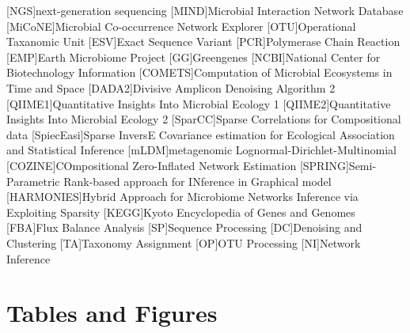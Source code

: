 \documentclass[letterpaper,12pt]{article}
\providecommand{\DIFaddbegin}{} %
\providecommand{\DIFaddend}{} %
\providecommand{\DIFdelbegin}{} %
\providecommand{\DIFdelend}{} %
\newcommand{\DIFscaledelfig}{0.5}
\newlength{\DIFdelgraphicswidth} %
\newlength{\DIFdelgraphicsheight} %
\newcommand{\DIFaddincludegraphics}[2][]{{\color{blue}\fbox{\DIFOincludegraphics[#1]{#2}}}} %
\newcommand{\DIFdelincludegraphics}[2][]{%
\sbox{\DIFdelgraphicsbox}{\DIFOincludegraphics[#1]{#2}}%
\settoboxwidth{\DIFdelgraphicswidth}{\DIFdelgraphicsbox} %
\settoboxtotalheight{\DIFdelgraphicsheight}{\DIFdelgraphicsbox} %
\scalebox{\DIFscaledelfig}{%
\parbox[b]{\DIFdelgraphicswidth}{\usebox{\DIFdelgraphicsbox}\\[-\baselineskip] \rule{\DIFdelgraphicswidth}{0em}}\llap{\resizebox{\DIFdelgraphicswidth}{\DIFdelgraphicsheight}{%
\setlength{\unitlength}{\DIFdelgraphicswidth}%
\begin{picture}(1,1)%
\thicklines\linethickness{2pt} %
{\color[rgb]{1,0,0}\put(0,0){\framebox(1,1){}}}%
{\color[rgb]{1,0,0}\put(0,0){\line( 1,1){1}}}%
{\color[rgb]{1,0,0}\put(0,1){\line(1,-1){1}}}%
\end{picture}%
}\hspace*{3pt}}} %
} %
\DeclareRobustCommand{\DIFaddbegin}{\DIFOaddbegin \let\includegraphics\DIFaddincludegraphics} %
\DeclareRobustCommand{\DIFaddend}{\DIFOaddend \let\includegraphics\DIFOincludegraphics} %
\DeclareRobustCommand{\DIFdelbegin}{\DIFOdelbegin \let\includegraphics\DIFdelincludegraphics} %
\DeclareRobustCommand{\DIFdelend}{\DIFOaddend \let\includegraphics\DIFOincludegraphics} %
\begin{document}


\begin{acronym}[XXXXXXXX]
    [NGS]{next-generation sequencing}
    [MIND]{Microbial Interaction Network Database}
    [MiCoNE]{Microbial Co-occurrence Network Explorer}
    [OTU]{Operational Taxanomic Unit}
    [ESV]{Exact Sequence Variant}
    [PCR]{Polymerase Chain Reaction}
    [EMP]{Earth Microbiome Project}
    [GG]{Greengenes}
    [NCBI]{National Center for Biotechnology Information}
    [COMETS]{Computation of Microbial Ecosystems in Time and Space}
    [DADA2]{Divisive Amplicon Denoising Algorithm 2}
    [QIIME1]{Quantitative Insights Into Microbial Ecology 1}
    [QIIME2]{Quantitative Insights Into Microbial Ecology 2}
    [SparCC]{Sparse Correlations for Compositional data}
    [SpiecEasi]{Sparse InversE Covariance estimation for Ecological Association and Statistical Inference}
    [mLDM]{metagenomic Lognormal-Dirichlet-Multinomial}
    \DIFdelbegin %
\DIFdelend \DIFaddbegin {}[COZINE]{COmpositional Zero-Inflated Network Estimation}
    [SPRING]{Semi-Parametric Rank-based approach for INference in Graphical model}
    [HARMONIES]{Hybrid Approach for Microbiome Networks Inference via Exploiting Sparsity}
    \DIFaddend {}[KEGG]{Kyoto Encyclopedia of Genes and Genomes}
    [FBA]{Flux Balance Analysis}
    \DIFaddbegin {}[SP]{Sequence Processing}
    \DIFaddend {}[DC]{Denoising and Clustering}
    [TA]{Taxonomy Assignment}
    [OP]{OTU Processing}
    [NI]{Network Inference}
\end{acronym}


\newpage
\section*{Tables and Figures}

\end{document}
